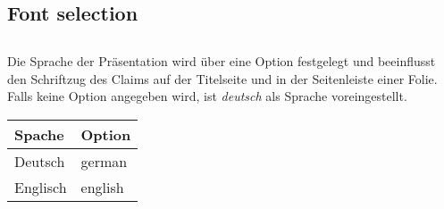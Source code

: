 \documentclass[a4paper,11pt]{article}
\begin{document}
\subsection{Font selection}

\subsection{}
\en{}
Die Sprache der Präsentation wird über eine Option festgelegt und beeinflusst den Schriftzug des Claims auf der Titelseite und in der Seitenleiste einer Folie. Falls keine Option angegeben wird, ist \emph{deutsch} als Sprache voreingestellt.
\begin{table}[H]%
  \begin{center}%
    \renewcommand{\arraystretch}{1.25}
    \begin{tabular}{>{\centering} m{2cm} >{\centering} m{2cm}}
      \hline
      \textbf{Spache} & \textbf{Option} \tabularnewline
      \hline
      Deutsch & german \tabularnewline
      Englisch & english \tabularnewline
      \hline
    \end{tabular}
    \renewcommand{\arraystretch}{1}
  \end{center}%
\end{table}%

\subsection{}
\end{document}
